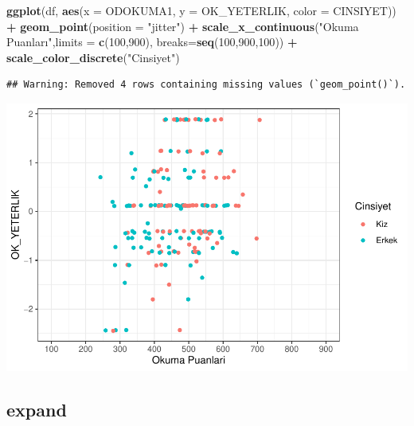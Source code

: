 \documentclass[
  oneside]{book}
\newenvironment{Shaded}{\begin{snugshade}}{\end{snugshade}}
\newcommand{\AttributeTok}[1]{\textcolor[rgb]{0.13,0.29,0.53}{#1}}
\newcommand{\DecValTok}[1]{\textcolor[rgb]{0.00,0.00,0.81}{#1}}
\newcommand{\FunctionTok}[1]{\textcolor[rgb]{0.13,0.29,0.53}{\textbf{#1}}}
\newcommand{\NormalTok}[1]{#1}
\newcommand{\SpecialCharTok}[1]{\textcolor[rgb]{0.81,0.36,0.00}{\textbf{#1}}}
\newcommand{\StringTok}[1]{\textcolor[rgb]{0.31,0.60,0.02}{#1}}
\begin{document}
\begin{Shaded}
\begin{Highlighting}[]
\FunctionTok{ggplot}\NormalTok{(df, }\FunctionTok{aes}\NormalTok{(}\AttributeTok{x =}\NormalTok{ ODOKUMA1,}
\AttributeTok{y =}\NormalTok{ OK\_YETERLIK,}
\AttributeTok{color =}\NormalTok{ CINSIYET)) }\SpecialCharTok{+}
\FunctionTok{geom\_point}\NormalTok{(}\AttributeTok{position =} \StringTok{"jitter"}\NormalTok{) }\SpecialCharTok{+}
\FunctionTok{scale\_x\_continuous}\NormalTok{(}\StringTok{"Okuma Puanları"}\NormalTok{,}\AttributeTok{limits =} \FunctionTok{c}\NormalTok{(}\DecValTok{100}\NormalTok{,}\DecValTok{900}\NormalTok{),}
         \AttributeTok{breaks=}\FunctionTok{seq}\NormalTok{(}\DecValTok{100}\NormalTok{,}\DecValTok{900}\NormalTok{,}\DecValTok{100}\NormalTok{)) }\SpecialCharTok{+}
\FunctionTok{scale\_color\_discrete}\NormalTok{(}\StringTok{"Cinsiyet"}\NormalTok{)}
\end{Highlighting}
\end{Shaded}

\begin{verbatim}
## Warning: Removed 4 rows containing missing values (`geom_point()`).
\end{verbatim}

\begin{center}\includegraphics[width=1\linewidth]{15-betimleyici-istatistik_files/figure-latex/unnamed-chunk-53-1} \end{center}

\hypertarget{expand}{%
\subsection{expand}\label{expand}}
\end{document}
